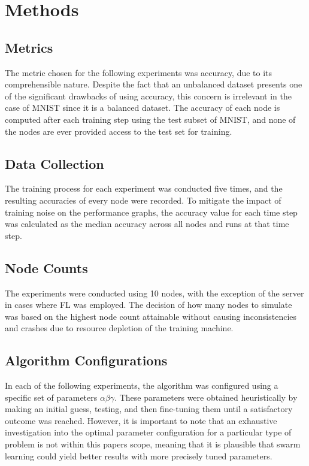 \section{Methods}
\subsection{Metrics}
The metric chosen for the following experiments was accuracy, due to its comprehensible nature. Despite the fact that an unbalanced dataset presents one of the significant drawbacks of using accuracy, this concern is irrelevant in the case of MNIST since it is a balanced dataset. The accuracy of each node is computed after each training step using the test subset of MNIST, and none of the nodes are ever provided access to the test set for training.

\subsection{Data Collection}
The training process for each experiment was conducted five times, and the resulting accuracies of every node were recorded. To mitigate the impact of training noise on the performance graphs, the accuracy value for each time step was calculated as the median accuracy across all nodes and runs at that time step.

\subsection{Node Counts}
The experiments were conducted using 10 nodes, with the exception of the server in cases where FL was employed. The decision of how many nodes to simulate was based on the highest node count attainable without causing inconsistencies and crashes due to resource depletion of the training machine.

\subsection{Algorithm Configurations}
In each of the following experiments, the algorithm was configured using a specific set of parameters $\alpha \beta \gamma$. These parameters were obtained heuristically by making an initial guess, testing, and then fine-tuning them until a satisfactory outcome was reached. However, it is important to note that an exhaustive investigation into the optimal parameter configuration for a particular type of problem is not within this papers scope, meaning that it is plausible that swarm learning could yield better results with more precisely tuned parameters.

